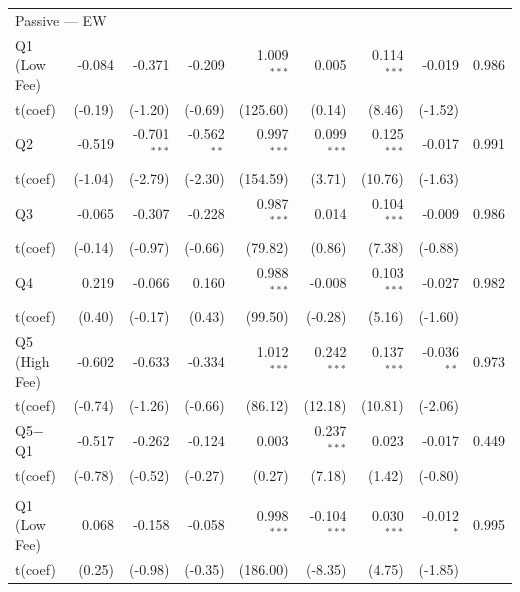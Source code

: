 \begin{table}[!htbp]
{\begin{tabular*}{\linewidth}{@{\extracolsep{\fill}}lrrrrrrrr}
\midrule
\multicolumn{9}{l}{Passive --- EW}\\
\hspace{1em}Q1 (Low Fee) & -0.084 & -0.371 & -0.209 & 1.009$^{***}$ & 0.005 & 0.114$^{***}$ & -0.019 & 0.986\\
\hspace{1em}t(coef) & (-0.19) & (-1.20) & (-0.69) & (125.60) & (0.14) & (8.46) & (-1.52) & \\
\hspace{1em}Q2 & -0.519 & -0.701$^{***}$ & -0.562$^{**}$ & 0.997$^{***}$ & 0.099$^{***}$ & 0.125$^{***}$ & -0.017 & 0.991\\
\hspace{1em}t(coef) & (-1.04) & (-2.79) & (-2.30) & (154.59) & (3.71) & (10.76) & (-1.63) & \\
\hspace{1em}Q3 & -0.065 & -0.307 & -0.228 & 0.987$^{***}$ & 0.014 & 0.104$^{***}$ & -0.009 & 0.986\\
\hspace{1em}t(coef) & (-0.14) & (-0.97) & (-0.66) & (79.82) & (0.86) & (7.38) & (-0.88) & \\
\hspace{1em}Q4 & 0.219 & -0.066 & 0.160 & 0.988$^{***}$ & -0.008 & 0.103$^{***}$ & -0.027 & 0.982\\
\hspace{1em}t(coef) & (0.40) & (-0.17) & (0.43) & (99.50) & (-0.28) & (5.16) & (-1.60) & \\
\hspace{1em}Q5 (High Fee) & -0.602 & -0.633 & -0.334 & 1.012$^{***}$ & 0.242$^{***}$ & 0.137$^{***}$ & -0.036$^{**}$ & 0.973\\
\hspace{1em}t(coef) & (-0.74) & (-1.26) & (-0.66) & (86.12) & (12.18) & (10.81) & (-2.06) & \\
\hspace{1em}Q5$-$Q1 & -0.517 & -0.262 & -0.124 & 0.003 & 0.237$^{***}$ & 0.023 & -0.017 & 0.449\\
\hspace{1em}t(coef) & (-0.78) & (-0.52) & (-0.27) & (0.27) & (7.18) & (1.42) & (-0.80) & \\
\addlinespace[0.3em]
\hline
\multicolumn{9}{l}{Passive --- VW}\\
\hspace{1em}Q1 (Low Fee) & 0.068 & -0.158 & -0.058 & 0.998$^{***}$ & -0.104$^{***}$ & 0.030$^{***}$ & -0.012$^{*}$ & 0.995\\
\hspace{1em}t(coef) & (0.25) & (-0.98) & (-0.35) & (186.00) & (-8.35) & (4.75) & (-1.85) & \\

\end{tabular*}}
\end{table}

